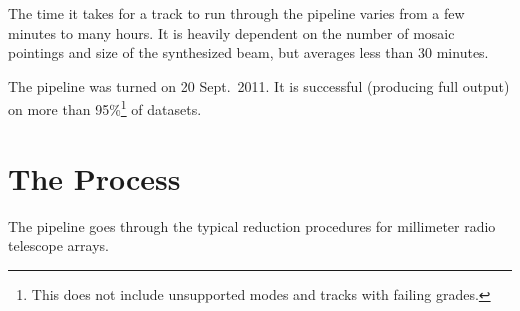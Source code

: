 The time it takes for a track to run through the pipeline varies from a few minutes to many hours. It is heavily dependent on the number of mosaic pointings and size of the synthesized beam, but averages less than 30 minutes.

The pipeline was turned on 20 Sept.\ 2011. It is successful (producing full output) on more than 95\%\footnote{This does not include unsupported modes and tracks with failing grades.} of datasets.

\section{The Process}

The pipeline goes through the typical reduction procedures for millimeter radio telescope arrays.

